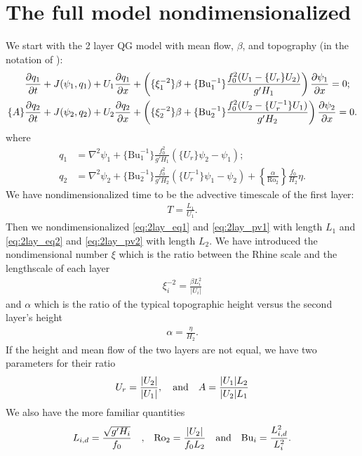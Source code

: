 \graphicspath{{2Layer_QG/code/plot_snap/figs/}}
\renewcommand{\Bu}{\text{Bu}}

\section{The full model nondimensionalized}
We start with the 2 layer QG model with mean flow, $\beta$, and topography \parencite[(5.85-86)]{Vallis_17} (in the notation of \cite{Vallis_96a}):
\begin{align}
    &\frac{\pe q_1}{\pe t}+J(\psi_1,q_1)+U_1\frac{\pe q_1}{\pe x}+\left(\{\xi_1^{-2}\}\beta+\{\Bu_1^{-1}\}\frac{f_0^2(U_1-\{U_r\}U_2)}{g'H_1}\right)\frac{\pe\psi_1}{\pe x} = 0;\label{eq:2lay_eq1}\\
    \{A\}&\frac{\pe q_2}{\pe t}+J(\psi_2,q_2)+U_2\frac{\pe q_2}{\pe x}+\left(\{\xi_2^{-2}\}\beta+\{\Bu_2^{-1}\}\frac{f_0^2(U_2-\{U_r^{-1}\}U_1)}{g'H_2}\right)\frac{\pe\psi_2}{\pe x} = 0.\label{eq:2lay_eq2}
\end{align}
where
\begin{align}
    q_1 &= \nabla^2\psi_1 + \{\Bu_1^{-1}\}\frac{f_0^2}{g'H_1}(\{U_r\}\psi_2-\psi_1);\label{eq:2lay_pv1}\\
    q_2 &= \nabla^2\psi_2 + \{\Bu_2^{-1}\}\frac{f_0^2}{g'H_2}(\{U_r^{-1}\}\psi_1-\psi_2)+\left\{\frac{\alpha}{\text{Ro}_2}\right\}\frac{f_0}{H_2}\eta.\label{eq:2lay_pv2}
\end{align}
We have nondimensionalized time to be the advective timescale of the first layer:
\begin{align}
    T = \frac{L_1}{U_1}.
\end{align}
Then we nondimensionalized \eqref{eq:2lay_eq1} and \eqref{eq:2lay_pv1} with length $L_1$ and \eqref{eq:2lay_eq2} and \eqref{eq:2lay_pv2} with length $L_2$. We have introduced the nondimensional number $\xi$ which is the ratio between the Rhine scale and the lengthscale of each layer \parencite{HeldLarichev_96}
\begin{align}
    \xi_i^{-2} = \frac{\beta L_i^2}{|U_i|}
\end{align}
and $\alpha$ which is the ratio of the typical topographic height versus the second layer's height
\begin{align}
    \alpha = \frac{\eta}{H_2}.
\end{align}
If the height and mean flow of the two layers are not equal, we have two parameters for their ratio
\begin{align}
    U_r = \frac{|U_2|}{|U_1|}, \quad \mbox{and} \quad A = \frac{|U_1|L_2}{|U_2|L_1}
\end{align}
We also have the more familiar quantities
\begin{align}
    L_{i,d} = \frac{\sqrt{g'H_i}}{f_0} \quad \mbox{,} \quad \text{Ro}_2 = \frac{|U_2|}{f_0L_2} \quad \mbox{and} \quad \text{Bu}_i = \frac{L_{i,d}^2}{L_i^2}.
\end{align}

